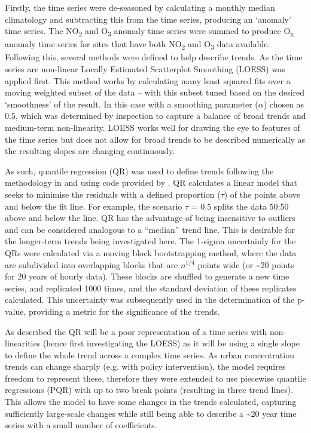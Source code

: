 \documentclass[journal abbreviation, manuscript]{copernicus}
\begin{document}
Firstly, the time series were de-seasoned by calculating a monthly median climatology and subtracting this from the time series, producing an ‘anomaly’ time series. The NO\textsubscript{2} and O\textsubscript{3} anomaly time series were summed to produce O\textsubscript{x} anomaly time series for sites that have both NO\textsubscript{2} and O\textsubscript{3} data available. Following this, several methods were defined to help describe trends. As the time series are non-linear Locally Estimated Scatterplot Smoothing (LOESS) was applied first. This method works by calculating many least squared fits over a moving weighted subset of the data – with this subset tuned based on the desired ‘smoothness’ of the result. In this case with a smoothing parameter ($\alpha$) chosen as 0.5, which was determined by inspection to capture a balance of broad trends and medium-term non-linearity. LOESS works well for drawing the eye to features of the time series but does not allow for broad trends to be described numerically as the resulting slopes are changing continuously. 

As such, quantile regression (QR) was used to define trends following the methodology in and using code provided by \cite{chang2023guidancenotebeststatistical}. QR calculates a linear model that seeks to minimise the residuals with a defined proportion ($\tau$) of the points above and below the fit line. For example, the scenario $\tau$ = 0.5 splits the data 50:50 above and below the line. QR has the advantage of being insensitive to outliers and can be considered analogous to a “median” trend line. This is desirable for the longer-term trends being investigated here. The 1-sigma uncertainly for the QRs were calculated via a moving block bootstrapping method, where the data are subdivided into overlapping blocks that are $n^{1/4}$ points wide (or \textasciitilde{20} points for 20 years of hourly data). These blocks are shuffled to generate a new time series, and replicated 1000 times, and the standard deviation of these replicates calculated. This uncertainty was subsequently used in the determination of the p-value, providing a metric for the significance of the trends. 

As described the QR will be a poor representation of a time series with non-linearities (hence first investigating the LOESS) as it will be using a single slope to define the whole trend across a complex time series. As urban concentration trends can change sharply (e.g. with policy intervention), the model requires freedom to represent these, therefore they were extended to use piecewise quantile regressions (PQR) with up to two break points (resulting in three trend lines). This allows the model to have some changes in the trends calculated, capturing sufficiently large-scale changes while still being able to describe a \textasciitilde{20} year time series with a small number of coefficients.
\end{document}
